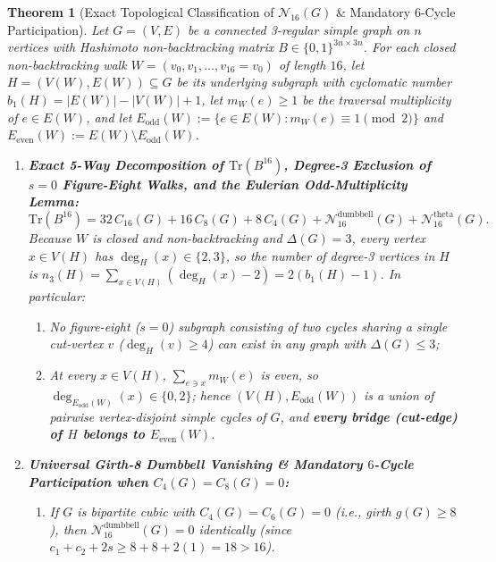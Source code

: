 \documentclass[10pt,a4paper]{article}
\newtheorem{theorem}{Theorem}[section]
\theoremstyle{definition}
\theoremstyle{remark}
\begin{document}
\begin{theorem}[Exact Topological Classification of $\mathcal{N}_{16}(G)$ \& Mandatory $6$-Cycle Participation]\label{thm:topological_n16}
Let $G = (V, E)$ be a connected 3-regular simple graph on $n$ vertices with Hashimoto non-backtracking matrix $B \in \{0,1\}^{3n \times 3n}$. For each closed non-backtracking walk $W = (v_0, v_1, \dots, v_{16} = v_0)$ of length $16$, let $H = (V(W), E(W)) \subseteq G$ be its underlying subgraph with cyclomatic number $b_1(H) = |E(W)| - |V(W)| + 1$, let $m_W(e) \ge 1$ be the traversal multiplicity of $e \in E(W)$, and let $E_{\mathrm{odd}}(W) := \{e \in E(W) : m_W(e) \equiv 1 \pmod 2\}$ and $E_{\mathrm{even}}(W) := E(W) \setminus E_{\mathrm{odd}}(W)$.
\begin{enumerate}[label=(\alph*),nosep]
  \item \textbf{Exact 5-Way Decomposition of $\mathrm{Tr}(B^{16})$, Degree-3 Exclusion of $s = 0$ Figure-Eight Walks, and the Eulerian Odd-Multiplicity Lemma:}
  \begin{equation}\label{eq:trb16_5way}
    \mathrm{Tr}(B^{16}) = 32\,C_{16}(G) + 16\,C_8(G) + 8\,C_4(G) + \mathcal{N}_{16}^{\mathrm{dumbbell}}(G) + \mathcal{N}_{16}^{\mathrm{theta}}(G).
  \end{equation}
  Because $W$ is closed and non-backtracking and $\Delta(G) = 3$, every vertex $x \in V(H)$ has $\deg_H(x) \in \{2, 3\}$, so the number of degree-3 vertices in $H$ is $n_3(H) = \sum_{x \in V(H)} (\deg_H(x) - 2) = 2(b_1(H) - 1)$. In particular:
  \begin{enumerate}[label=(\roman*),nosep]
    \item No figure-eight ($s = 0$) subgraph consisting of two cycles sharing a single cut-vertex $v$ ($\deg_H(v) \ge 4$) can exist in any graph with $\Delta(G) \le 3$;
    \item At every $x \in V(H)$, $\sum_{e \ni x} m_W(e)$ is even, so $\deg_{E_{\mathrm{odd}}(W)}(x) \in \{0, 2\}$; hence $(V(H), E_{\mathrm{odd}}(W))$ is a union of pairwise vertex-disjoint simple cycles of $G$, and \textbf{every bridge (cut-edge) of $H$ belongs to $E_{\mathrm{even}}(W)$}.
  \end{enumerate}
  \item \textbf{Universal Girth-8 Dumbbell Vanishing \& Mandatory $6$-Cycle Participation when $C_4(G) = C_8(G) = 0$:}
  \begin{enumerate}[label=(\roman*),nosep]
    \item If $G$ is bipartite cubic with $C_4(G) = C_6(G) = 0$ (i.e., girth $g(G) \ge 8$), then $\mathcal{N}_{16}^{\mathrm{dumbbell}}(G) = 0$ identically (since $c_1 + c_2 + 2s \ge 8 + 8 + 2(1) = 18 > 16$).

\end{enumerate}
\end{enumerate}
\end{theorem}
\end{document}
